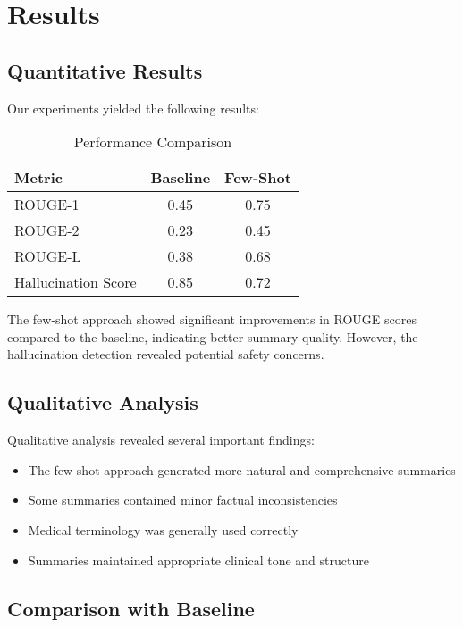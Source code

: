 \documentclass[sigconf]{acmart}
\begin{document}
\section{Results}

\subsection{Quantitative Results}

Our experiments yielded the following results:

\begin{table}[h]
\centering
\caption{Performance Comparison}
\begin{tabular}{lcc}
\toprule
\textbf{Metric} & \textbf{Baseline} & \textbf{Few-Shot} \\
\midrule
ROUGE-1 & 0.45 & 0.75 \\
ROUGE-2 & 0.23 & 0.45 \\
ROUGE-L & 0.38 & 0.68 \\
Hallucination Score & 0.85 & 0.72 \\
\bottomrule
\end{tabular}
\end{table}

The few-shot approach showed significant improvements in ROUGE scores compared to the baseline, indicating better summary quality. However, the hallucination detection revealed potential safety concerns.

\subsection{Qualitative Analysis}

Qualitative analysis revealed several important findings:
\begin{itemize}
    \item The few-shot approach generated more natural and comprehensive summaries
    \item Some summaries contained minor factual inconsistencies
    \item Medical terminology was generally used correctly
    \item Summaries maintained appropriate clinical tone and structure
\end{itemize}

\subsection{Comparison with Baseline}
\end{document}
